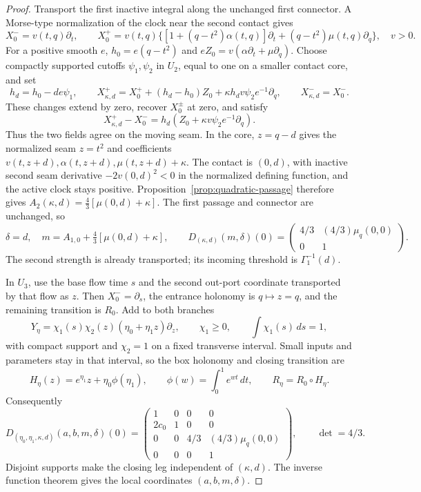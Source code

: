 \begin{proof}
Transport the first inactive integral along the unchanged first
connector. A Morse-type normalization of the clock near the second contact
gives
\[
 X_0^-=v(t,q)\partial_t,\qquad
 X_0^+=v(t,q)\{[1+(q-t^2)\alpha(t,q)]\partial_t
                    +(q-t^2)\mu(t,q)\partial_q\},\quad v>0.
\]
For a positive smooth \(e\),
\(h_0=e(q-t^2)\) and
\(eZ_0=v(\alpha\partial_t+\mu\partial_q)\).
Choose compactly supported cutoffs \(\psi_1,\psi_2\) in \(U_2\),
equal to one on a smaller contact core, and set
\begin{equation}\label{eq:specified-contact-controls}
 h_d=h_0-de\psi_1,\qquad
 X_{\kappa,d}^+=X_0^++(h_d-h_0)Z_0
                  +\kappa h_dv\psi_2e^{-1}\partial_q,
 \qquad X_{\kappa,d}^-=X_0^-.
\end{equation}
These changes extend by zero, recover \(X_0^\pm\) at zero, and satisfy
\[
 X_{\kappa,d}^+-X_0^-
 =h_d(Z_0+\kappa v\psi_2e^{-1}\partial_q).
\]
Thus the two fields agree on the moving seam.
In the core, \(z=q-d\) gives the normalized seam \(z=t^2\) and
coefficients \(v(t,z+d),\alpha(t,z+d),\mu(t,z+d)+\kappa\).
The contact is \((0,d)\), with inactive second seam derivative
\(-2v(0,d)^2<0\) in the normalized defining function, and the
active clock stays positive. Proposition~\ref{prop:quadratic-passage}
therefore gives \(A_2(\kappa,d)=\tfrac43[\mu(0,d)+\kappa]\).
The first passage and connector are unchanged, so
\begin{equation}\label{eq:specified-strength-jacobian}
 \delta=d,\quad m=A_{1,0}+\tfrac43[\mu(0,d)+\kappa],\qquad
 D_{(\kappa,d)}(m,\delta)(0)=
 \begin{pmatrix}4/3&(4/3)\mu_q(0,0)\\0&1\end{pmatrix}.
\end{equation}
The second strength is already transported; its incoming threshold is
\(\Gamma_1^{-1}(d)\).

In \(U_3\), use the base flow time \(s\) and the second out-port
coordinate transported by that flow as \(z\). Then
\(X_0^-=\partial_s\), the entrance holonomy is \(q\mapsto z=q\),
and the remaining transition is \(R_0\). Add to both branches
\[
 Y_\eta=\chi_1(s)\chi_2(z)(\eta_0+\eta_1z)\partial_z,
 \qquad \chi_1\ge0,\qquad \int\chi_1(s)\,ds=1,
\]
with compact support and \(\chi_2=1\) on a fixed transverse interval.
Small inputs and parameters stay in that interval, so the box
holonomy and closing transition are
\[
 H_\eta(z)=e^{\eta_1}z+\eta_0\phi(\eta_1),\qquad
 \phi(w)=\int_0^1e^{wt}\,dt,\qquad R_\eta=R_0\circ H_\eta.
\]
Consequently
\begin{equation}\label{eq:specified-four-jacobian}
 D_{(\eta_0,\eta_1,\kappa,d)}(a,b,m,\delta)(0)=
 \begin{pmatrix}
 1&0&0&0\\2c_0&1&0&0\\
 0&0&4/3&(4/3)\mu_q(0,0)\\0&0&0&1
 \end{pmatrix},\qquad \det=4/3.
\end{equation}
Disjoint supports make the closing leg independent of \((\kappa,d)\).
The inverse function theorem gives the local coordinates
\((a,b,m,\delta)\).


\end{proof}
